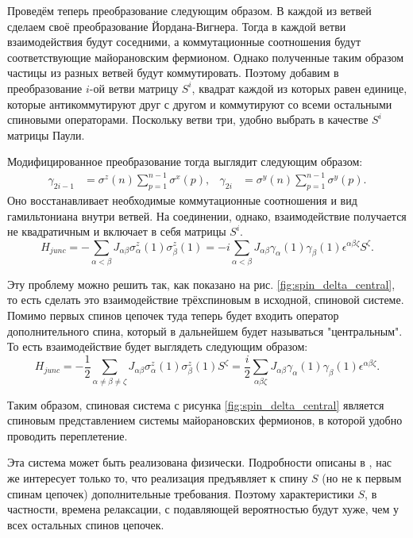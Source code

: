 \documentclass[a4paper,12pt]{article}
\theoremstyle{plain} %
\theoremstyle{definition} %
\theoremstyle{remark} %
\begin{document}
Проведём теперь преобразование следующим образом. В каждой из ветвей сделаем своё преобразование Йордана-Вигнера. Тогда в каждой ветви взаимодействия будут соседними, а коммутационные соотношения будут соответствующие майорановским фермионом. Однако полученные таким образом частицы из разных ветвей будут коммутировать. Поэтому добавим в преобразование $i$-ой ветви матрицу $S^i$, квадрат каждой из которых равен единице, которые антикоммутируют друг с другом и коммутируют со всеми остальными спиновыми операторами. Поскольку ветви три, удобно выбрать в качестве $S^i$ матрицы Паули.

Модифицированное преобразование тогда выглядит следующим образом:
\begin{align}
    \gamma_{2i-1} &= \sigma^z (n) \sum\limits_{p=1}^{n-1} \sigma^x (p), & 
    \gamma_{2i} &= \sigma^y (n) \sum\limits_{p=1}^{n-1} \sigma^y (p).
\end{align}
Оно восстанавливает необходимые коммутационные соотношения и вид гамильтониана внутри ветвей. На соединении, однако, взаимодействие получается не квадратичным и включает в себя матрицы $S^i$.
\begin{equation}
    H_{junc} = - \sum\limits_{\alpha < \beta} J_{\alpha \beta} \sigma_\alpha^z (1) \sigma_\beta^z (1) = - i \sum\limits_{\alpha < \beta} J_{\alpha \beta} \gamma_\alpha (1) \gamma_\beta (1) \epsilon^{\alpha \beta \zeta} S^\zeta.
\end{equation}

Эту проблему можно решить так, как показано на рис. \ref{fig:spin_delta_central}, то есть сделать это взаимодействие трёхспиновым в исходной, спиновой системе. Помимо первых спинов цепочек туда теперь будет входить оператор дополнительного спина, который в дальнейшем будет называться "центральным"$ $. То есть взаимодействие будет выглядеть следующим образом:
\begin{equation}
    H_{junc} = - \frac{1}{2} \sum\limits_{\alpha \neq \beta \neq \zeta} J_{\alpha \beta} \sigma_\alpha^z (1) \sigma_\beta^z (1) S^\zeta = \frac{i}{2} \sum\limits_{\alpha \beta \zeta} J_{\alpha \beta} \gamma_\alpha (1) \gamma_\beta (1) \epsilon^{\alpha \beta \zeta}.
    \label{eq:junc_H}
\end{equation}

Таким образом, спиновая система с рисунка \ref{fig:spin_delta_central} является спиновым представлением системы майорановских фермионов, в которой удобно проводить переплетение.

Эта система может быть реализована физически. Подробности описаны в \cite{main}, нас же интересует только то, что реализация предъявляет к спину $S$ (но не к первым спинам цепочек) дополнительные требования. Поэтому характеристики $S$, в частности, времена релаксации, с подавляющей вероятностью будут хуже, чем у всех остальных спинов цепочек.
\end{document}
